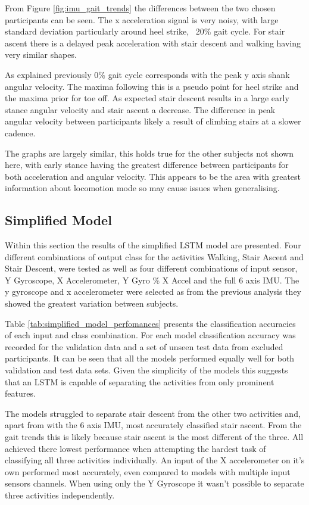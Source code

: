 \documentclass[sensors,article,submit,moreauthors,pdftex]{Definitions/mdpi}
\begin{document}
From Figure \ref{fig:imu_gait_trends} the differences between the two chosen participants can be seen. The x acceleration signal is very noisy, with large standard deviation particularly around heel strike, ~20\% gait cycle. For stair ascent there is a delayed peak acceleration with stair descent and walking having very similar shapes.

As explained previously 0\% gait cycle corresponds with the peak y axis shank angular velocity. The maxima following this is a pseudo point for heel strike and the maxima prior for toe off. As expected stair descent results in a large early stance angular velocity and stair ascent a decrease. The difference in peak angular velocity between participants likely a result of climbing stairs at a slower cadence.

The graphs are largely similar, this holds true for the other subjects not shown here, with early stance having the greatest difference between participants for both acceleration and angular velocity. This appears to be the area with greatest information about locomotion mode so may cause issues when generalising.

\subsection{Simplified Model}
Within this section the results of the simplified LSTM model are presented. Four different combinations of output class for the activities Walking, Stair Ascent and Stair Descent, were tested as well as four different combinations of input sensor, Y Gyroscope, X Accelerometer, Y Gyro \% X Accel and the full 6 axis IMU. The y gyroscope and x accelerometer were selected as from the previous analysis they showed the greatest variation between subjects.

Table \ref{tab:simplified_model_perfomances} presents the classification accuracies of each input and class combination. For each model classification accuracy was recorded for the validation data and a set of unseen test data from excluded participants. It can be seen that all the models performed equally well for both validation and test data sets. Given the simplicity of the models this suggests that an LSTM is capable of separating the activities from only prominent features.

The models struggled to separate stair descent from the other two activities and, apart from with the 6 axis IMU, most accurately classified stair ascent. From the gait trends this is likely because stair ascent is the most different of the three. All achieved there lowest performance when attempting the hardest task of classifying all three activities individually. An input of the X accelerometer on it's own performed most accurately, even compared to models with multiple input sensors channels. When using only the Y Gyroscope it wasn't possible to separate three activities independently.
\end{document}
